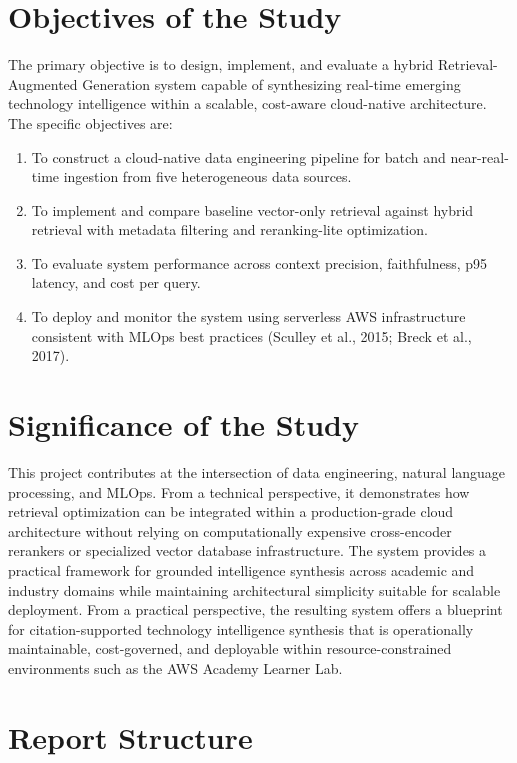 \documentclass[12pt,a4paper]{report}
\begin{document}
\section{Objectives of the Study}
\label{sec:objectives}

The primary objective is to design, implement, and evaluate a hybrid Retrieval-Augmented Generation system capable of synthesizing real-time emerging technology intelligence within a scalable, cost-aware cloud-native architecture. The specific objectives are:

\begin{enumerate}[leftmargin=0.5in]
  \item To construct a cloud-native data engineering pipeline for batch and near-real-time ingestion from five heterogeneous data sources.
  \item To implement and compare baseline vector-only retrieval against hybrid retrieval with metadata filtering and reranking-lite optimization.
  \item To evaluate system performance across context precision, faithfulness, p95 latency, and cost per query.
  \item To deploy and monitor the system using serverless AWS infrastructure consistent with MLOps best practices (Sculley et al., 2015; Breck et al., 2017).
\end{enumerate}

\section{Significance of the Study}
\label{sec:significance}

This project contributes at the intersection of data engineering, natural language processing, and MLOps. From a technical perspective, it demonstrates how retrieval optimization can be integrated within a production-grade cloud architecture without relying on computationally expensive cross-encoder rerankers or specialized vector database infrastructure. The system provides a practical framework for grounded intelligence synthesis across academic and industry domains while maintaining architectural simplicity suitable for scalable deployment. From a practical perspective, the resulting system offers a blueprint for citation-supported technology intelligence synthesis that is operationally maintainable, cost-governed, and deployable within resource-constrained environments such as the AWS Academy Learner Lab.

\section{Report Structure}
\end{document}
